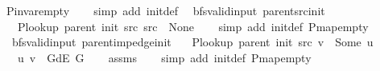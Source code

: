 \begin{isabellebody}
%
\isatagproof
{}\isamarkupfalse%
\ P{\isachardot}{\kern0pt}invar{\isacharunderscore}{\kern0pt}empty\isanewline
\ \ \isamarkupfalse%
\ {\isacharparenleft}{\kern0pt}simp\ add{\isacharcolon}{\kern0pt}\ init{\isacharunderscore}{\kern0pt}def{\isacharparenright}{\kern0pt}%
\endisatagproof
{\isafoldproof}%
%
\isadelimproof
\isanewline
%
\endisadelimproof
\isanewline
{}\isamarkupfalse%
\ {\isacharparenleft}{\kern0pt}\ bfs{\isacharunderscore}{\kern0pt}valid{\isacharunderscore}{\kern0pt}input{\isacharparenright}{\kern0pt}\ parent{\isacharunderscore}{\kern0pt}src{\isacharunderscore}{\kern0pt}init{\isacharcolon}{\kern0pt}\isanewline
\ \ \ {\isachardoublequoteopen}P{\isacharunderscore}{\kern0pt}lookup\ {\isacharparenleft}{\kern0pt}parent\ {\isacharparenleft}{\kern0pt}init\ src{\isacharparenright}{\kern0pt}{\isacharparenright}{\kern0pt}\ src\ {\isacharequal}{\kern0pt}\ None{\isachardoublequoteclose}\isanewline
%
\isadelimproof
\ \ %
\endisadelimproof
%
\isatagproof
{}\isamarkupfalse%
\ {\isacharparenleft}{\kern0pt}simp\ add{\isacharcolon}{\kern0pt}\ init{\isacharunderscore}{\kern0pt}def\ P{\isachardot}{\kern0pt}map{\isacharunderscore}{\kern0pt}empty{\isacharparenright}{\kern0pt}%
\endisatagproof
{\isafoldproof}%
%
\isadelimproof
\isanewline
%
\endisadelimproof
\isanewline
{}\isamarkupfalse%
\ {\isacharparenleft}{\kern0pt}\ bfs{\isacharunderscore}{\kern0pt}valid{\isacharunderscore}{\kern0pt}input{\isacharparenright}{\kern0pt}\ parent{\isacharunderscore}{\kern0pt}imp{\isacharunderscore}{\kern0pt}edge{\isacharunderscore}{\kern0pt}init{\isacharcolon}{\kern0pt}\isanewline
\ \ \ {\isachardoublequoteopen}P{\isacharunderscore}{\kern0pt}lookup\ {\isacharparenleft}{\kern0pt}parent\ {\isacharparenleft}{\kern0pt}init\ src{\isacharparenright}{\kern0pt}{\isacharparenright}{\kern0pt}\ v\ {\isacharequal}{\kern0pt}\ Some\ u{\isachardoublequoteclose}\isanewline
\ \ \ {\isachardoublequoteopen}{\isacharparenleft}{\kern0pt}u{\isacharcomma}{\kern0pt}\ v{\isacharparenright}{\kern0pt}\ {\isasymin}\ G{\isachardot}{\kern0pt}dE\ G{\isachardoublequoteclose}\isanewline
%
\isadelimproof
\ \ %
\endisadelimproof
%
\isatagproof
{}\isamarkupfalse%
\ assms\isanewline
\ \ \isamarkupfalse%
\ {\isacharparenleft}{\kern0pt}simp\ add{\isacharcolon}{\kern0pt}\ init{\isacharunderscore}{\kern0pt}def\ P{\isachardot}{\kern0pt}map{\isacharunderscore}{\kern0pt}empty{\isacharparenright}{\kern0pt}%
\endisatagproof
{\isafoldproof}%

\end{isabellebody}
